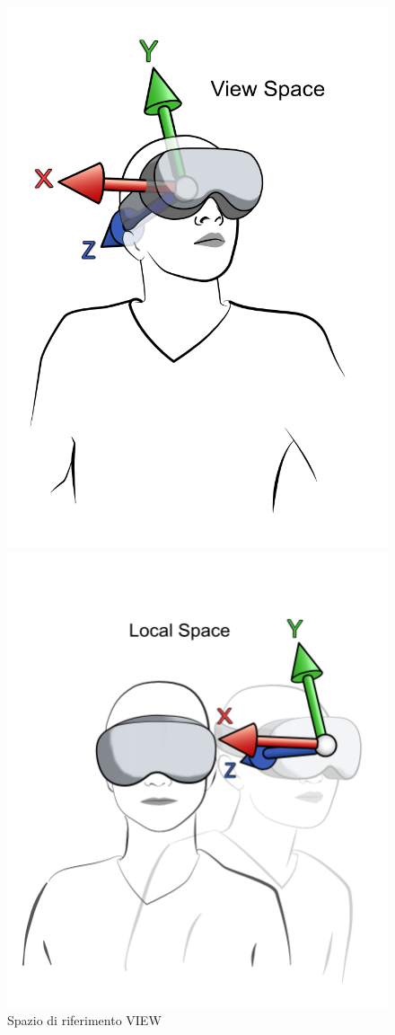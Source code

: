 \documentclass[twoside]{supsistudent}
\begin{document}
\begin{figure}[H]
  \begin{minipage}{.3\textwidth}
    \centering
    \includegraphics[width=.9\linewidth]{resources/view_space.png}
    \caption{Spazio di riferimento VIEW}
  \end{minipage}
  \begin{minipage}{.3\textwidth}
    \centering
    \includegraphics[width=.9\linewidth]{resources/local_space.png}

\end{minipage}
\end{figure}
\end{document}

